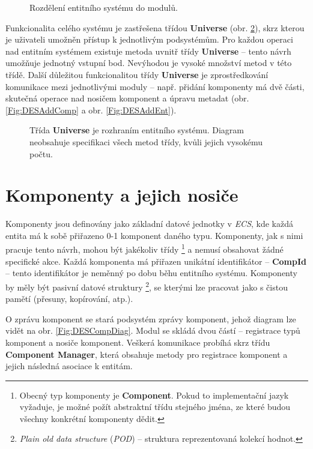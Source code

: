 \begin{figure}[H]
	\caption{Rozdělení entitního systému do modulů.}
	\label{Fig:DESModules}
\end{figure}

Funkcionalita celého systému je zastřešena třídou \textbf{Universe} (obr. \ref{Fig:DESUniverse}), skrz kterou je uživateli umožněn přístup k jednotlivým podsystémům. Pro každou operaci nad entitním systémem existuje metoda uvnitř třídy \textbf{Universe} -- tento návrh umožňuje jednotný vstupní bod. Nevýhodou je vysoké množství metod v této třídě. Další důležitou funkcionalitou třídy \textbf{Universe} je zprostředkování komunikace mezi jednotlivými moduly -- např. přidání komponenty má dvě části, skutečná operace nad nosičem komponent a úpravu metadat (obr. \ref{Fig:DESAddComp} a obr. \ref{Fig:DESAddEnt}). 

\begin{figure}[H]
	\caption{Třída \textbf{Universe} je rozhraním entitního systému. Diagram neobsahuje specifikaci všech metod třídy, kvůli jejich vysokému počtu.}
	\label{Fig:DESUniverse}
\end{figure}

\section{Komponenty a jejich nosiče}

Komponenty jsou definovány jako základní datové jednotky v \emph{ECS}, kde každá entita má k sobě přiřazeno 0-1 komponent daného typu. Komponenty, jak s nimi pracuje tento návrh, mohou být jakékoliv třídy \footnote{Obecný typ komponenty je \textbf{Component}. Pokud to implementační jazyk vyžaduje, je možné požít abstraktní třídu stejného jména, ze které budou všechny konkrétní komponenty dědit.} a nemusí obsahovat žádné specifické akce. Každá komponenta má přiřazen unikátní identifikátor -- \textbf{CompId} -- tento identifikátor je neměnný po dobu běhu entitního systému. Komponenty by měly být pasivní datové struktury \footnote{\emph{Plain old data structure} (\emph{POD}) -- struktura reprezentovaná kolekcí hodnot.}, se kterými lze pracovat jako s čistou pamětí (přesuny, kopírování, atp.).

O zprávu komponent se stará podsystém zprávy komponent, jehož diagram lze vidět na obr. \ref{Fig:DESCompDiag}. Modul se skládá dvou částí -- registrace typů komponent a nosiče komponent. Veškerá komunikace probíhá skrz třídu \textbf{Component Manager}, která obsahuje metody pro registrace komponent a jejich následná asociace k entitám. 


